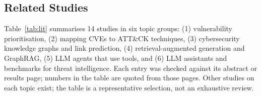 \documentclass[12pt, a4paper]{article}
\newcommand{\ATTCK}{ATT\&CK}
\begin{document}
\subsection{Related Studies}
Table~\ref{tab:lit} summarises 14 studies in six topic groups: (1) vulnerability prioritisation, (2) mapping CVEs to \ATTCK{} techniques, (3) cybersecurity knowledge graphs and link prediction, (4) retrieval-augmented generation and GraphRAG, (5) LLM agents that use tools, and (6) LLM assistants and benchmarks for threat intelligence. Each entry was checked against its abstract or results page; numbers in the table are quoted from those pages. Other studies on each topic exist; the table is a representative selection, not an exhaustive review.
\end{document}
